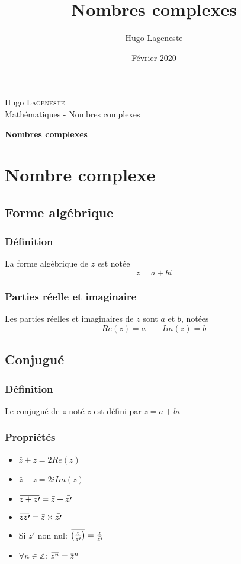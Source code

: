 \documentclass[a4paper]{article}
\title{Nombres complexes}
\author{Hugo Lageneste}
\date{Février 2020}
\newcommand{\overbar}[1]{\mkern 1.5mu\overline{\mkern-1.5mu#1\mkern-1.5mu}\mkern 1.5mu}
\begin{document}
{Hugo \textsc{Lageneste}}\\
{Mathématiques - Nombres complexes}

\begin{center}
 \newcommand{\HRule}{\rule{\linewidth}{0.5mm}}
 {\huge \bfseries Nombres complexes}\\[0.1cm]
\end{center}

\section{Nombre complexe}
\subsection{Forme algébrique}
\subsubsection{Définition}
{La forme algébrique de $z$ est notée}
\[z=a+bi\]

\subsubsection{Parties réelle et imaginaire}
{Les parties réelles et imaginaires de $z$ sont $a$ et $b$, notées}
\[Re(z)=a \quad\quad Im(z)=b\]

\subsection{Conjugué}
\subsubsection{Définition}
{Le conjugué de $z$ noté $\bar{z}$ est défini par $\bar{z}=a+bi$}

\subsubsection{Propriétés}
\begin{multicols}{3}
	\begin{itemize}
  		\item{$\bar{z} + z = 2Re(z)$}
  		\item{$\bar{z} - z = 2iIm(z)$}
  		\item{$\overbar{z + z\prime} = \bar{z} + \bar{z\prime}$}
  		\item{$\overbar{zz\prime} = \bar{z} \times \bar{z\prime}$}
  		\item{Si $z\prime$ non nul: $\overbar{\left(\frac{z}{z\prime}\right)} = \frac{\bar{z}}{\bar{z\prime}}$}
  		\item{$\forall n \in \mathbb{Z}$: $\overbar{z^n}=\overbar{z}^n$}
	\end{itemize}
\end{multicols}
\end{document}
